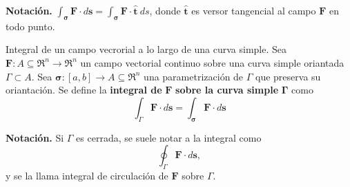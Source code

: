 \textbf{Notaci\'on.} $\int_{\boldsymbol{\sigma}}\mathbf{F}\cdot d\mathbf{s}=\int_{\boldsymbol{\sigma}}\mathbf{F}\cdot\hat{\mathbf{t}}\:ds$, donde $\hat{\mathbf{t}}$ es versor tangencial al campo $\mathbf{F}$ en todo punto.

\begin{definition}
    Integral de un campo vecrorial a lo largo de una curva simple.
    Sea $\mathbf{F}:A\subseteq\Re^n\to\Re^n$ un campo vectorial continuo sobre una curva simple oriantada $\Gamma\subset A$. Sea $\boldsymbol{\sigma}:[a,b]\to A\subseteq\Re^n$ una parametrizaci\'on de $\Gamma$ que preserva su oriantaci\'on. Se define la \textbf{integral de} $\mathbf{F}$ \textbf{sobre la curva simple} $\boldsymbol{\Gamma}$ como
    \[
        \int_{\Gamma}\mathbf{F}\cdot d\mathbf{s}=\int_{\boldsymbol{\sigma}}\mathbf{F}\cdot d\mathbf{s}  
    \]
\end{definition}

\textbf{Notaci\'on.} Si $\Gamma$ es cerrada, se suele notar a la integral como
\[
    \oint_{\Gamma}\mathbf{F}\cdot d\mathbf{s},  
\]
y se la llama integral de circulaci\'on de $\mathbf{F}$ sobre $\Gamma$.
